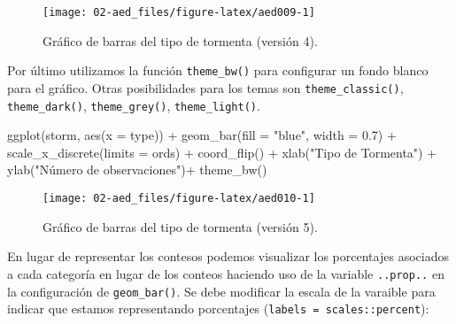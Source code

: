 \documentclass[
]{book}
\newenvironment{Shaded}{\begin{snugshade}}{\end{snugshade}}
\newcommand{\AttributeTok}[1]{\textcolor[rgb]{0.77,0.63,0.00}{#1}}
\newcommand{\FloatTok}[1]{\textcolor[rgb]{0.00,0.00,0.81}{#1}}
\newcommand{\FunctionTok}[1]{\textcolor[rgb]{0.00,0.00,0.00}{#1}}
\newcommand{\NormalTok}[1]{#1}
\newcommand{\SpecialCharTok}[1]{\textcolor[rgb]{0.00,0.00,0.00}{#1}}
\newcommand{\StringTok}[1]{\textcolor[rgb]{0.31,0.60,0.02}{#1}}
\begin{document}
\begin{figure}

{\centering \texttt{[image: 02-aed\_files/figure-latex/aed009-1]} 

}

\caption{Gráfico de barras del tipo de tormenta (versión 4).}\label{fig:aed009}
\end{figure}

Por último utilizamos la función \texttt{theme\_bw()} para configurar un fondo blanco para el gráfico. Otras posibilidades para los temas son \texttt{theme\_classic()}, \texttt{theme\_dark()}, \texttt{theme\_grey()}, \texttt{theme\_light()}.

\begin{Shaded}
\begin{Highlighting}[]
\FunctionTok{ggplot}\NormalTok{(storm, }\FunctionTok{aes}\NormalTok{(}\AttributeTok{x =}\NormalTok{ type)) }\SpecialCharTok{+} 
  \FunctionTok{geom\_bar}\NormalTok{(}\AttributeTok{fill =} \StringTok{"blue"}\NormalTok{, }\AttributeTok{width =} \FloatTok{0.7}\NormalTok{) }\SpecialCharTok{+} 
  \FunctionTok{scale\_x\_discrete}\NormalTok{(}\AttributeTok{limits =}\NormalTok{ ords) }\SpecialCharTok{+}
  \FunctionTok{coord\_flip}\NormalTok{() }\SpecialCharTok{+} 
  \FunctionTok{xlab}\NormalTok{(}\StringTok{"Tipo de Tormenta"}\NormalTok{) }\SpecialCharTok{+} \FunctionTok{ylab}\NormalTok{(}\StringTok{"Número de observaciones"}\NormalTok{)}\SpecialCharTok{+}
  \FunctionTok{theme\_bw}\NormalTok{() }
\end{Highlighting}
\end{Shaded}

\begin{figure}

{\centering \texttt{[image: 02-aed\_files/figure-latex/aed010-1]} 

}

\caption{Gráfico de barras del tipo de tormenta (versión 5).}\label{fig:aed010}
\end{figure}

En lugar de representar los contesos podemos visualizar los porcentajes asociados a cada categoría en lugar de los conteos haciendo uso de la variable \texttt{..prop..} en la configuración de \texttt{geom\_bar()}. Se debe modificar la escala de la varaible para indicar que estamos representando porcentajes (\texttt{labels\ =\ scales::percent}):
\end{document}
